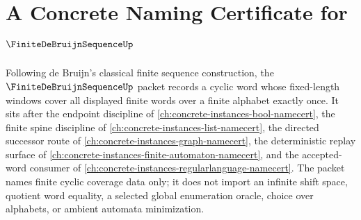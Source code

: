 \chapter{A Concrete Naming Certificate for $\FiniteDeBruijnSequenceUp$}
\label{ch:concrete-instances-finite-de-bruijn-sequence-namecert}

Following de Bruijn's classical finite sequence construction, the $\FiniteDeBruijnSequenceUp$ packet records a cyclic word whose fixed-length windows cover all displayed finite words over a finite alphabet exactly once. It sits after the endpoint discipline of \autoref{ch:concrete-instances-bool-namecert}, the finite spine discipline of \autoref{ch:concrete-instances-list-namecert}, the directed successor route of \autoref{ch:concrete-instances-graph-namecert}, the deterministic replay surface of \autoref{ch:concrete-instances-finite-automaton-namecert}, and the accepted-word consumer of \autoref{ch:concrete-instances-regularlanguage-namecert}. The packet names finite cyclic coverage data only; it does not import an infinite shift space, quotient word equality, a selected global enumeration oracle, choice over alphabets, or ambient automata minimization.

